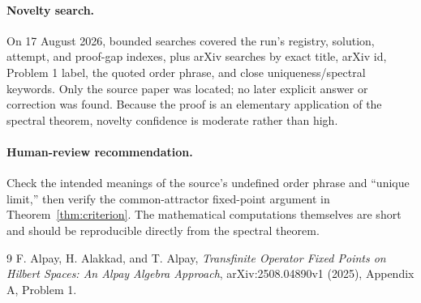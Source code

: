 \documentclass[11pt]{article}
\newcommand{\1}{\mathbf 1}
\begin{document}
\paragraph{Novelty search.}
On 17 August 2026, bounded searches covered the run's registry, solution,
attempt, and proof-gap indexes, plus arXiv searches by exact title, arXiv id,
Problem 1 label, the quoted order phrase, and close uniqueness/spectral
keywords.  Only the source paper was located; no later explicit answer or
correction was found.  Because the proof is an elementary application of the
spectral theorem, novelty confidence is moderate rather than high.

\paragraph{Human-review recommendation.}
Check the intended meanings of the source's undefined order phrase and
``unique limit,'' then verify the common-attractor fixed-point argument in
Theorem~\ref{thm:criterion}.  The mathematical computations themselves are
short and should be reproducible directly from the spectral theorem.

\begin{thebibliography}{9}
F. Alpay, H. Alakkad, and T. Alpay,
\emph{Transfinite Operator Fixed Points on Hilbert Spaces: An Alpay Algebra
Approach}, arXiv:2508.04890v1 (2025), Appendix A, Problem 1.
\end{thebibliography}
\end{document}
